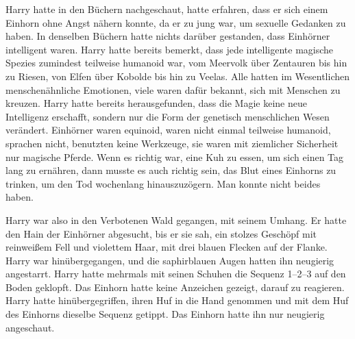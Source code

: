 Harry hatte in den Büchern nachgeschaut, hatte erfahren, dass er sich einem Einhorn ohne Angst nähern konnte, da er zu jung war, um sexuelle Gedanken zu haben. In denselben Büchern hatte nichts darüber gestanden, dass Einhörner intelligent waren. Harry hatte bereits bemerkt, dass jede intelligente magische Spezies zumindest teilweise humanoid war, vom Meervolk über Zentauren bis hin zu Riesen, von Elfen über Kobolde bis hin zu Veelas. Alle hatten im Wesentlichen menschenähnliche Emotionen, viele waren dafür bekannt, sich mit Menschen zu kreuzen. Harry hatte bereits herausgefunden, dass die Magie keine neue Intelligenz erschafft, sondern nur die Form der genetisch menschlichen Wesen verändert.
Einhörner waren equinoid, waren nicht einmal teilweise humanoid, sprachen nicht, benutzten keine Werkzeuge, sie waren mit ziemlicher Sicherheit nur magische Pferde.
Wenn es richtig war, eine Kuh zu essen, um sich einen Tag lang zu ernähren, dann musste es auch richtig sein, das Blut eines Einhorns zu trinken, um den Tod wochenlang hinauszuzögern. Man konnte nicht beides haben.

Harry war also in den Verbotenen Wald gegangen, mit seinem Umhang. Er hatte den Hain der Einhörner abgesucht, bis er sie sah, ein stolzes Geschöpf mit reinweißem Fell und violettem Haar, mit drei blauen Flecken auf der Flanke. Harry war hinübergegangen, und die saphirblauen Augen hatten ihn neugierig angestarrt. Harry hatte mehrmals mit seinen Schuhen die Sequenz 1–2–3 auf den Boden geklopft.
Das Einhorn hatte keine Anzeichen gezeigt, darauf zu reagieren. Harry hatte hinübergegriffen, ihren Huf in die Hand genommen und mit dem Huf des Einhorns dieselbe Sequenz getippt. Das Einhorn hatte ihn nur neugierig angeschaut.


